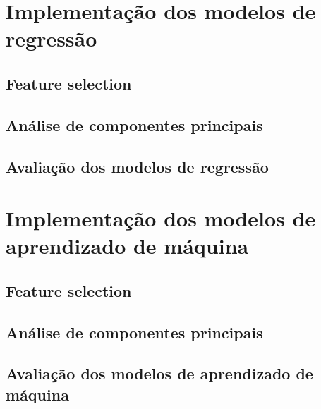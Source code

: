 \section{Implementação dos modelos de regressão}
\lipsum[1]

\subsection{Feature selection}
\lipsum[1]

\subsection{Análise de componentes principais}
\lipsum[1]

\subsection{Avaliação dos modelos de regressão}
\lipsum[1]

\section{Implementação dos modelos de aprendizado de máquina}
\lipsum[1]

\subsection{Feature selection}
\lipsum[1]

\subsection{Análise de componentes principais}
\lipsum[1]

\subsection{Avaliação dos modelos de aprendizado de máquina}
\lipsum[1]